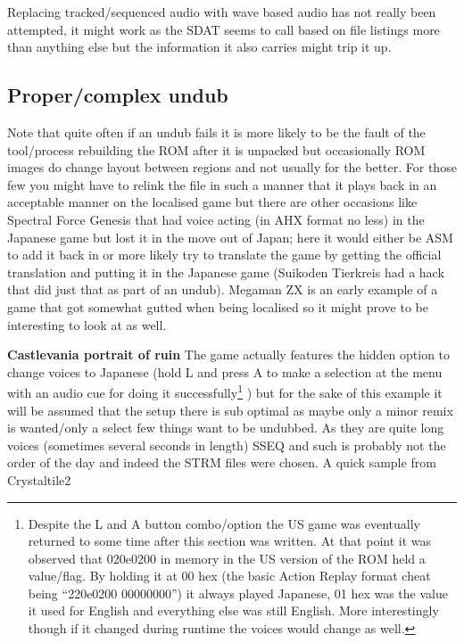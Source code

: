 \documentclass[
]{book}
\begin{document}
Replacing tracked/sequenced audio with wave based audio has not really been attempted, it might work as the SDAT seems to call based on file listings more than anything else but the information it also carries might trip it up.

\hypertarget{propercomplex-undub}{%
\subsection{Proper/complex undub}\label{propercomplex-undub}}

Note that quite often if an undub fails it is more likely to be the fault of the tool/process rebuilding the ROM after it is unpacked but occasionally ROM images do change layout between regions and not usually for the better. For those few you might have to relink the file in such a manner that it plays back in an acceptable manner on the localised game but there are other occasions like Spectral Force Genesis that had voice acting (in AHX format no less) in the Japanese game but lost it in the move out of Japan; here it would either be ASM to add it back in or more likely try to translate the game by getting the official translation and putting it in the Japanese game (Suikoden Tierkreis had a hack that did just that as part of an undub). Megaman ZX is an early example of a game that got somewhat gutted when being localised so it might prove to be interesting to look at as well.

\textbf{Castlevania portrait of ruin} The game actually features the hidden option to change voices to Japanese (hold L and press A to make a selection at the menu with an audio cue for doing it successfully\footnote{Despite the L and A button combo/option the US game was eventually returned to some time after this section was written. At that point it was observed that 020e0200 in memory in the US version of the ROM held a value/flag. By holding it at 00 hex (the basic Action Replay format cheat being ``220e0200 00000000'') it always played Japanese, 01 hex was the value it used for English and everything else was still English. More interestingly though if it changed during runtime the voices would change as well.} ) but for the sake of this example it will be assumed that the setup there is sub optimal as maybe only a minor remix is wanted/only a select few things want to be undubbed. As they are quite long voices (sometimes several seconds in length) SSEQ and such is probably not the order of the day and indeed the STRM files were chosen. A quick sample from Crystaltile2
\end{document}
